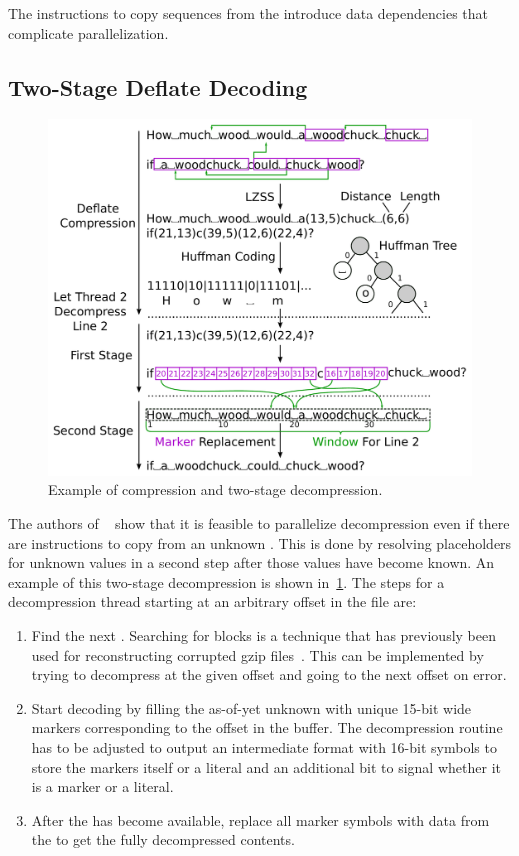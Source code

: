 The instructions to copy sequences from the \backrefwindow introduce data dependencies that complicate parallelization.



\subsection{Two-Stage Deflate Decoding}
\label{sct:theory:two-stage-decompression}

\begin{figure}
    \centering
    \includegraphics[width=0.95\linewidth]{figures/two-stage-decompression.pdf}
    \caption{Example of  compression and two-stage decompression.}
    \label{fig:two-stage-example}
\end{figure}

The authors of \pugz~\cite{pugz} show that it is feasible to parallelize decompression even if there are instructions to copy from an unknown \backrefwindow.
This is done by resolving placeholders for unknown values in a second step after those values have become known.
An example of this two-stage decompression is shown in~\cref{fig:two-stage-example}.
The steps for a decompression thread starting at an arbitrary offset in the file are:
\begin{enumerate}
    \item Find the next .
          Searching for  blocks is a technique that has previously been used for reconstructing corrupted gzip files~\cite{park2008data}.
          This can be implemented by trying to decompress at the given offset and going to the next offset on error.
    \item Start decoding by filling the as-of-yet unknown \backrefwindow with unique 15-bit wide markers corresponding to the offset in the buffer.
          The decompression routine has to be adjusted to output an intermediate format with 16-bit symbols to store the markers itself or a literal and an additional bit to signal whether it is a marker or a literal.
    \item After the \backrefwindow has become available, replace all marker symbols with data from the \backrefwindow to get the fully decompressed contents.
\end{enumerate}

